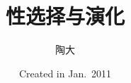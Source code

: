 \documentclass[UTF8,lualatex]{ctexbeamer}
\title{\kaishu 性选择与演化}
\author{陶大}
\institute{纳拓软件}
\date{\small
    Created in Jan.\ 2011}
\begin{document}
\songti
    
\begin{frame}
\titlepage
\end{frame}
\end{document}
